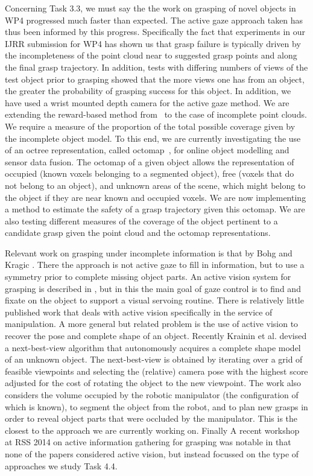 \documentclass[a4paper,11pt,pdf]{pacmanreport}
\begin{document}
Concerning Task 3.3, we must say the the work on grasping of novel objects in WP4 progressed much faster than expected. The active gaze approach taken has thus been informed by this progress. Specifically the fact that experiments in our IJRR submission for WP4 has shown us that grasp failure is typically driven by the incompleteness of the point cloud near to suggested grasp points and along the final grasp trajectory. In addition, tests with differing numbers of views of the test object prior to grasping showed that the more views one has from an object, the greater the probability of grasping success for this object. In addition, we have used a wrist mounted depth camera for the active gaze method. We are extending the reward-based method from~\cite{nunez2013models} to the case of incomplete point clouds. We require a measure of the proportion of the total possible coverage given by the incomplete object model. To this end, we are currently investigating the use of an octree representation, called octomap~\cite{hornung13auro}, for online object modelling and sensor data fusion. The octomap of a given object allows the representation of occupied (known voxels belonging to a segmented object), free (voxels that do not belong to an object), and unknown areas of the scene, which might belong to the object if they are near known and occupied voxels. We are now implementing a method to estimate the safety of a grasp trajectory given this octomap. We are also testing different measures of the coverage of the object pertinent to a candidate grasp given the point cloud and the octomap representations.

Relevant work on grasping under incomplete information is that by Bohg and Kragic \cite{bohg:icra11}. There the approach is not active gaze to fill in information, but to use a symmetry prior to complete missing object parts. An active vision system for grasping is described in \cite{gratal:irosws10}, but in this the main goal of gaze control is to find and fixate on the object to support a visual servoing routine. There is relatively little published work that deals with active vision specifically in the service of manipulation. A more general but related problem is the use of active vision to recover the pose and complete shape of an object. Recently Krainin et al. \cite{Kra11Aut} devised a next-best-view algorithm that autonomously acquires a complete shape model of an unknown object. The next-best-view is obtained by iterating over a grid of feasible viewpoints and selecting the (relative) camera pose with the highest score adjusted for the cost of rotating the object to the new viewpoint. The work also considers the volume occupied by the robotic manipulator (the configuration of which is known), to segment the object from the robot, and to plan new grasps in order to reveal object parts that were occluded by the manipulator. This is the closest to the approach we are currently working on. Finally A recent workshop at RSS 2014 on active information gathering for grasping was notable in that none of the papers considered active vision, but instead focussed on the type of approaches we study Task 4.4.
\end{document}
